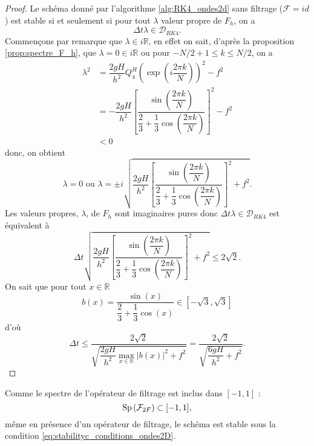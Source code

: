 \begin{proof}
Le schéma donné par l'algorithme \ref{alg:RK4_ondes2d} sans filtrage ($\mathcal{F}=id$) est stable si et seulement si pour tout $\lambda$ valeur propre de $F_h$, on a 
\begin{equation}
\Delta t \lambda \in \mathcal{D}_{RK4}.
\end{equation}
Commençons par remarque que $\lambda \in i \mathbb{R}$, en effet on sait, d'après la proposition \ref{prop:spectre_F_h}, que $\lambda = 0 \in i \mathbb{R}$ ou pour $-N/2+1 \leq k \leq N/2$, on a
\begin{align*}
\lambda^2 & = \dfrac{2gH}{h^2} Q_4^H \left( \exp \left( i \dfrac{2 \pi k}{N}  \right) \right)^2 - f^2 \\
	& = - \dfrac{2 g H}{h^2} \left[ \dfrac{\sin \left( \dfrac{2 \pi k}{N}  \right)}{\dfrac{2}{3} + \dfrac{1}{3} \cos \left( \dfrac{2 \pi k}{N}  \right)} \right]^2 - f^2\\
	& < 0
\end{align*}
donc, on obtient
\begin{equation}
\lambda = 0 \text{ ou } \lambda = \pm i \sqrt{\dfrac{2gH}{h^2} \left[ \dfrac{\sin \left( \dfrac{2 \pi k}{N}  \right)}{\dfrac{2}{3} + \dfrac{1}{3} \cos \left( \dfrac{2 \pi k}{N}  \right)} \right]^2 + f^2}.
\end{equation}
Les valeurs propres, $\lambda$, de $F_h$ sont imaginaires pures donc $\Delta t \lambda \in \mathcal{D}_{RK4}$ est équivalent à 
\begin{equation}
\Delta t \sqrt{\dfrac{2gH}{h^2} \left[ \dfrac{\sin \left( \dfrac{2 \pi k}{N}  \right)}{\dfrac{2}{3} + \dfrac{1}{3} \cos \left( \dfrac{2 \pi k}{N}  \right)} \right]^2 + f^2} \leq 2 \sqrt{2}.
\end{equation}
On sait que pour tout $x \in \mathbb{R}$
\begin{equation}
b(x) = \dfrac{\sin \left( x  \right)}{\dfrac{2}{3} + \dfrac{1}{3} \cos \left( x  \right)} \in [- \sqrt{3}, \sqrt{3}]
\end{equation}
d'où
\begin{equation}
\Delta t \leq \dfrac{2 \sqrt{2}}{\sqrt{\dfrac{2gH}{h^2} \max_{x \in \mathbb{R}}|b(x)|^2 + f^2}} =  \dfrac{2 \sqrt{2}}{\sqrt{\dfrac{6 g H}{h^2} + f^2}}.
\end{equation}
\end{proof}
Comme le spectre de l'opérateur de filtrage est inclus dans $[-1,1]$ :
\begin{equation}
\text{Sp} \left( \mathcal{F}_{2F} \right) \subset [-1,1],
\end{equation}
même en présence d'un opérateur de filtrage, le schéma est stable sous la condition \eqref{eq:stabilityc_conditions_ondes2D}.

